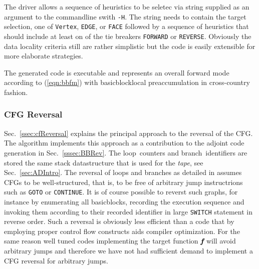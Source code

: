 \documentclass[11pt]{article}
\newcommand{\Loop}{loop}
\newcommand{\branch}{branch}
\newcommand{\basicblock}{basicblock}
\newcommand{\bmf}{\mbox{\bf\em f}}
\newcommand{\code}[1]{{\small\tt{#1}}}
\newcommand{\refsec}[1]{{Sec.~\ref{#1}}}
\newcommand{\refeqn}[1]{{(\ref{#1})}}
\begin{document}
The driver allows a sequence of heuristics to be seletec via string supplied as 
an argument to the commandline swith \code{-H}. The string needs to contain 
the target selection, one of \code{Vertex}, \code{EDGE}, or \code{FACE} followed by 
a sequence of heuristics that should include at least on of the tie breakers \code{FORWARD} or 
\code{REVERSE}. 
Obviously the data locality criteria still are rather simplistic but 
the code is easily extensible for more elaborate strategies. 

The generated code is executable and represents an overall forward mode 
according to \refeqn{eqn:bbfm} with \basicblock\-local preaccumulation in 
cross-country fashion. 

\subsubsection{CFG Reversal}\label{sssec:cfgRevAlg}

\refsec{ssec:cfReversal} explains the principal approach to the reversal 
of the CFG. The algorithm implements this approach as a contribution to the 
adjoint code generation in \refsec{sssec:BBRev}. 
The \Loop\ counters and \branch\ identifiers are stored the same 
stack datastructure that is used for the {\em tape}, see \refsec{sec:ADIntro}.  
The reversal of loops and branches as detailed in \cite{NULF04CFR} assumes 
CFGs to be well-structured, that is, to be free of arbitrary jump instructrions 
such as \code{GOTO} or \code{CONTINUE}. 
It is of course possible to reverst such graphs, for instance by enumerating
all {\basicblock}s, recording the execution sequence and invoking them according 
to their recorded identifier in  large  \code {SWITCH} statement in reverse order.
Such a reversal is obviously less efficient than a code that by employing proper 
control flow constructs aids compiler optimization. 
For the same reason well tuned codes implementing the target function $\bmf$ will 
avoid arbitrary jumps and therefore we have not had sufficient demand to implement 
a CFG reversal for arbitrary jumps. 
\end{document}
